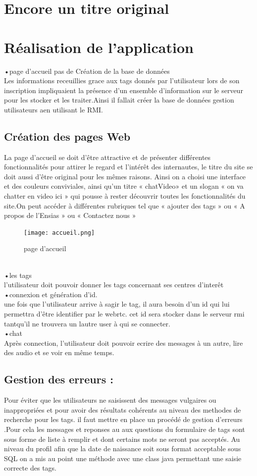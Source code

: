 \documentclass[oneside,12pt,a4paper]{book}
\begin{document}
\section{Encore un titre original}

\section{Réalisation de l’application }
•page d'accueil
pas de Création de la base de données\\
Les informations receuillies grace aux tags donnés par l'utilisateur lors de son inscription impliquaient la présence d'un ensemble d'information sur le serveur pour les stocker et les traiter.Ainsi il fallait créer la base de données gestion utilisateurs aen utilisant le RMI.\\

\subsection{Création des pages Web}
La page d’accueil se doit d’être attractive et de présenter différentes fonctionnalités pour attirer le regard et l’intérêt des internautes, le titre du site se doit aussi d’être original pour les mêmes raisons.  Ainsi on a choisi une interface et des couleurs conviviales, ainsi qu’un titre « chatVideo» et un slogan « on va chatter en video ici » qui pousse à rester découvrir toutes les fonctionnalités du site.On peut accéder à différentes rubriques tel que « ajouter des tags » ou « A propos de l’Ensias » ou « Contactez nous »
\begin{figure}[ht]
\centering\texttt{[image: accueil.png]}
\caption{page d'accueil}
\end{figure}
\\
•les tags\\
l'utilisateur doit pouvoir donner les tags concernant ses centres d'interêt
•connexion et génération d'id. \\
une fois que l'utilisateur arrive à sagir le tag, il aura besoin d'un id qui lui permettra d'être identifier par le webrtc. cet id sera stocker dans le serveur rmi tantqu'il ne trouvera un lautre user à qui se connecter.\\
•chat\\
Après connection, l'utilisateur doit pouvoir ecrire des messages à un autre, lire des audio et se voir en même temps.\\

\subsection{Gestion des erreurs :}
Pour éviter que les utilisateurs ne saisissent des messages vulgaires ou inappropriées et pour avoir des résultats cohérents au niveau des methodes de recherche pour les tags. il faut mettre en place un procédé de gestion d’erreurs .Pour cela les messages et reponses au aux questions du formulaire de tags sont sous forme de liste à remplir et dont certains mots ne seront pas acceptés. Au niveau du profil afin que la date de naissance soit sous format acceptable sous SQL on a mis au point une méthode avec une class java permettant une saisie correcte des tags.
\end{document}
